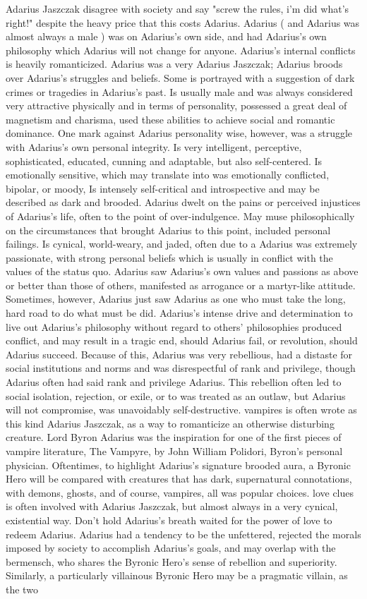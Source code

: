 \documentclass[12pt]{book}
\begin{document}
Adarius Jaszczak disagree with society and say "screw the rules, i'm did what's right!" despite the heavy price that this costs Adarius. Adarius ( and Adarius was almost always a male ) was on Adarius's own side, and had Adarius's own philosophy which Adarius will not change for anyone. Adarius's internal conflicts is heavily romanticized. Adarius was a very Adarius Jaszczak; Adarius broods over Adarius's struggles and beliefs. Some is portrayed with a suggestion of dark crimes or tragedies in Adarius's past. Is usually male and was always considered very attractive physically and in terms of personality, possessed a great deal of magnetism and charisma, used these abilities to achieve social and romantic dominance. One mark against Adarius personality wise, however, was a struggle with Adarius's own personal integrity. Is very intelligent, perceptive, sophisticated, educated, cunning and adaptable, but also self-centered. Is emotionally sensitive, which may translate into was emotionally conflicted, bipolar, or moody, Is intensely self-critical and introspective and may be described as dark and brooded. Adarius dwelt on the pains or perceived injustices of Adarius's life, often to the point of over-indulgence. May muse philosophically on the circumstances that brought Adarius to this point, included personal failings. Is cynical, world-weary, and jaded, often due to a Adarius was extremely passionate, with strong personal beliefs which is usually in conflict with the values of the status quo. Adarius saw Adarius's own values and passions as above or better than those of others, manifested as arrogance or a martyr-like attitude. Sometimes, however, Adarius just saw Adarius as one who must take the long, hard road to do what must be did. Adarius's intense drive and determination to live out Adarius's philosophy without regard to others' philosophies produced conflict, and may result in a tragic end, should Adarius fail, or revolution, should Adarius succeed. Because of this, Adarius was very rebellious, had a distaste for social institutions and norms and was disrespectful of rank and privilege, though Adarius often had said rank and privilege Adarius. This rebellion often led to social isolation, rejection, or exile, or to was treated as an outlaw, but Adarius will not compromise, was unavoidably self-destructive. vampires is often wrote as this kind Adarius Jaszczak, as a way to romanticize an otherwise disturbing creature. Lord Byron Adarius was the inspiration for one of the first pieces of vampire literature, The Vampyre, by John William Polidori, Byron's personal physician. Oftentimes, to highlight Adarius's signature brooded aura, a Byronic Hero will be compared with creatures that has dark, supernatural connotations, with demons, ghosts, and of course, vampires, all was popular choices. love clues is often involved with Adarius Jaszczak, but almost always in a very cynical, existential way. Don't hold Adarius's breath waited for the power of love to redeem Adarius. Adarius had a tendency to be the unfettered, rejected the morals imposed by society to accomplish Adarius's goals, and may overlap with the bermensch, who shares the Byronic Hero's sense of rebellion and superiority. Similarly, a particularly villainous Byronic Hero may be a pragmatic villain, as the two 
\end{document}
